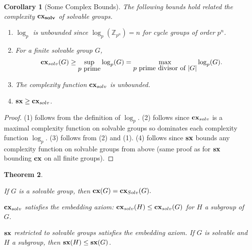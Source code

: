 \documentclass[a4paper,11pt]{amsart}
\newtheorem{theorem}{Theorem}[section]
\newtheorem{corollary}[theorem]{Corollary}
\theoremstyle{definition}
\newcommand{\cx}{\mbox{\bf cx}}
\newcommand{\sx}{{\bf sx}}
\newcommand{\solv}{{\bf solv}}
\newcommand{\cxsolv}{\cx_{solv}}
\newcommand{\Z}{\mathbb{Z}}
\newcommand{\1}{{\mathbf 1}}
\begin{document}
\begin{corollary}[Some Complex Bounds]
The following bounds hold related  the complexity $\cx_\solv$ of solvable groups. 
\begin{enumerate} 
\item $\log_p$ is unbounded since $\log_p(\Z_{p^n})=n$ for cycle groups of order $p^n$.
\item  For a finite solvable group $G$,
$$\cxsolv(G) \geq \sup_{\mbox{$p$ prime}} \log_p(G)
   = \max_{\mbox{$p$ prime divisor of $|G|$}} \log_p(G).$$
\item The complexity function $\cxsolv$ is unbounded. 
\item  $\sx \geq \cxsolv$.
\end{enumerate}
\end{corollary}
\begin{proof} (1) follows from the definition of $\log_p$.  (2) follows since $\cxsolv$ is a maximal complexity function on solvable groups so dominates each complexity function $\log_p$. (3) follows from (2) and (1). 
(4) follows since $\sx$ bounds any complexity function on solvable groups from above (same proof as for $\sx$ bounding $\cx$ on all finite groups). 
\end{proof}
 







\begin{theorem}\label{cpxsolv-subgroup-ax}
\enumerate
\item If $G$ is a solvable group, then $\cx(G)=\cx_{Solv}(G).$
\item $\cxsolv$ satisfies the embedding axiom:
 $\cxsolv(H)\leq \cxsolv(G)$ for $H$ a subgroup of $G$.
 \item $\sx$ restricted to solvable groups satisfies the embedding axiom.  If $G$ is solvable and $H$ a subgroup, then $\sx(H) \leq \sx(G)$. 
\end{theorem}
\end{document}
